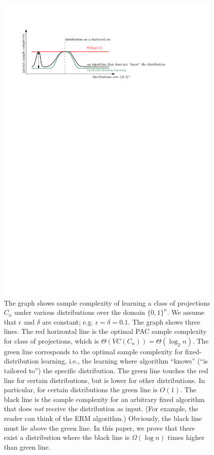 \documentclass[10pt]{article}
\begin{document}
\begin{figure}
\centering
\includegraphics{figure}
\caption{The graph shows sample complexity of learning a class of projections
$C_n$ under various distributions over the domain $\{0,1\}^n$. We assume that
$\epsilon$ and $\delta$ are constant; e.g. $\epsilon = \delta = 0.1$. The graph
shows three lines. The red horizontal line is the optimal PAC sample complexity for class of
projections, which is $\Theta(VC(C_n)) = \Theta(\log_2 n)$. The green line corresponds to
the optimal sample complexity for fixed-distribution learning, i.e., the learning where algorithm ``knows''
(``is tailored to'') the specific distribution. The green line touches the red
line for certain distributions, but is lower for other distributions.
In particular, for certain distributions the green line is $O(1)$.
The black line is the sample complexity for an arbitrary fixed algorithm
that does \emph{not} receive the distribution as input. (For example, the reader can think of the ERM
algorithm.) Obviously, the black line must lie above the green line. In this paper,
we prove that there exist a distribution where the black line is $\Omega(\log
n)$ times higher than green line.}
\label{figure:sample-complexity}
\end{figure}
\end{document}
